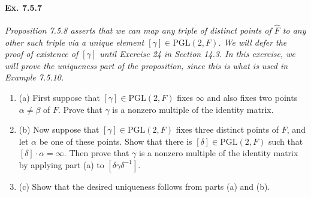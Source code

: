 \documentclass[11pt,a4paper]{article}
\newcommand{\be} {\begin{enumerate}}
\newcommand{\ee} {\end{enumerate}}
\begin{document}
\paragraph{Ex. 7.5.7}

{\it Proposition 7.5.8 asserts that we can map any triple of distinct points of $\hat{F}$ to any other such triple via a unique element $[\gamma] \in \mathrm{PGL}(2,F)$. We will defer the proof of existence of $[\gamma]$ until Exercise 24 in Section 14.3. In this exercise, we will prove the uniqueness part of the proposition, since this is what is used in Example 7.5.10.
\be
\item[(a)] First suppose that $[\gamma] \in  \mathrm{PGL}(2,F)$ fixes $\infty$ and also fixes two points $\alpha \ne \beta$ of $F$. Prove that $\gamma$ is a nonzero multiple of the identity matrix.
\item[(b)] Now suppose that $[\gamma] \in  \mathrm{PGL}(2,F)$ fixes three distinct points of $F$, and let $\alpha$ be one of these points. Show that there is $[\delta] \in  \mathrm{PGL}(2,F)$ such that $[\delta]\cdot \alpha = \infty$. Then prove that $\gamma$ is a nonzero multiple of the identity matrix by applying part (a) to $[\delta \gamma \delta^{-1}]$.
\item[(c)] Show that the desired uniqueness follows from parts (a) and (b).
\ee
}
\end{document}
